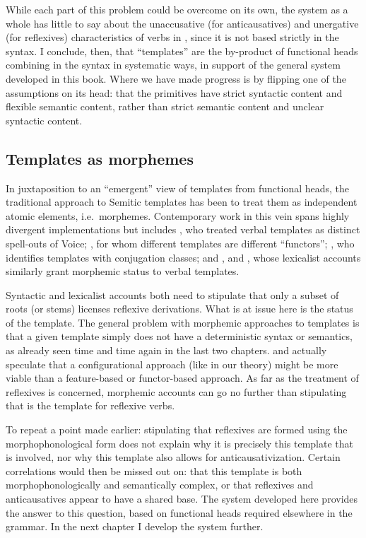 {While each part of this problem could be overcome on its own, the system as a whole has little to say about the unaccusative (for anticausatives) and unergative (for reflexives) characteristics of verbs in {\thit}, since it is not based strictly in the syntax. I conclude, then, that ``templates'' are the by-product of functional heads combining in the syntax in systematic ways, in support of the general system developed in this book. Where we have made progress is by flipping one of the assumptions on its head: that the primitives have strict syntactic content and flexible semantic content, rather than strict semantic content and unclear syntactic content.

	\subsection{Templates as morphemes} \label{vz:others:morph}
In juxtaposition to an ``emergent'' view of templates from functional heads, the traditional approach to Semitic templates has been to treat them as independent atomic elements, i.e.~morphemes. Contemporary work in this vein spans highly divergent implementations but includes \cite{arad03,arad05}, who treated verbal templates as distinct spell-outs of Voice; \cite{borer13oup}, for whom different templates are different ``functors''; \cite{aronoff94,aronoff07}, who identifies templates with conjugation classes; and \cite{reinhartsiloni05}, \cite{schwarzwald08} and \cite{laks11,laks14}, whose lexicalist accounts similarly grant morphemic status to verbal templates.

Syntactic and lexicalist accounts both need to stipulate that only a subset of roots (or stems) licenses reflexive derivations. What is at issue here is the status of the template. The general problem with morphemic approaches to templates is that a given template simply does not have a deterministic syntax or semantics, as already seen time and time again in the last two chapters. \citet[198]{arad05} and \citet[564]{borer13oup} actually speculate that a configurational approach (like in our theory) might be more viable than a feature-based or functor-based approach. As far as the treatment of reflexives is concerned, morphemic accounts can go no further than stipulating that {\thit} is the template for reflexive verbs.

To repeat a point made earlier: stipulating that reflexives are formed using the morphophonological form {\thit} does not explain why it is precisely this template that is involved, nor why this template also allows for anticausativization. Certain correlations would then be missed out on: that this template is both morphophonologically and semantically complex, or that reflexives and anticausatives appear to have a shared base. The system developed here provides the answer to this question, based on functional heads required elsewhere in the grammar. In the next chapter I develop the system further.

}
